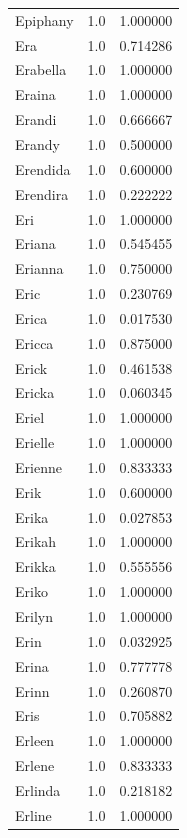\documentclass[
  letterpaper,
  DIV=11,
  numbers=noendperiod]{scrreprt}
\begin{document}
\begin{tabular}{lrr}
Epiphany        &   1.0 &   1.000000 \\
Era             &   1.0 &   0.714286 \\
Erabella        &   1.0 &   1.000000 \\
Eraina          &   1.0 &   1.000000 \\
Erandi          &   1.0 &   0.666667 \\
Erandy          &   1.0 &   0.500000 \\
Erendida        &   1.0 &   0.600000 \\
Erendira        &   1.0 &   0.222222 \\
Eri             &   1.0 &   1.000000 \\
Eriana          &   1.0 &   0.545455 \\
Erianna         &   1.0 &   0.750000 \\
Eric            &   1.0 &   0.230769 \\
Erica           &   1.0 &   0.017530 \\
Ericca          &   1.0 &   0.875000 \\
Erick           &   1.0 &   0.461538 \\
Ericka          &   1.0 &   0.060345 \\
Eriel           &   1.0 &   1.000000 \\
Erielle         &   1.0 &   1.000000 \\
Erienne         &   1.0 &   0.833333 \\
Erik            &   1.0 &   0.600000 \\
Erika           &   1.0 &   0.027853 \\
Erikah          &   1.0 &   1.000000 \\
Erikka          &   1.0 &   0.555556 \\
Eriko           &   1.0 &   1.000000 \\
Erilyn          &   1.0 &   1.000000 \\
Erin            &   1.0 &   0.032925 \\
Erina           &   1.0 &   0.777778 \\
Erinn           &   1.0 &   0.260870 \\
Eris            &   1.0 &   0.705882 \\
Erleen          &   1.0 &   1.000000 \\
Erlene          &   1.0 &   0.833333 \\
Erlinda         &   1.0 &   0.218182 \\
Erline          &   1.0 &   1.000000 \\

\end{tabular}
\end{document}
